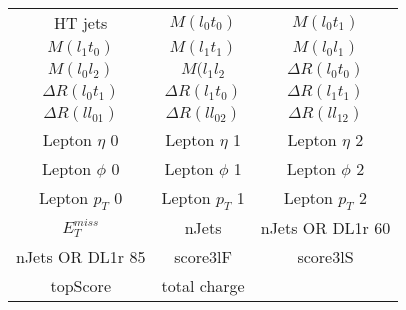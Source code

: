   \begin{center}
  \begin{tabular}{ccc}
    \hline\hline
    HT jets & $M(l_0t_0)$ & $M(l_0t_1)$ \\
    $M(l_1t_0)$ & $M(l_1t_1)$ & $M(l_0l_1)$ \\
    $M(l_0l_2)$ & $M(l_1l_2$ & $\Delta R(l_0t_0)$ \\
    $\Delta R(l_0t_1)$ & $\Delta R(l_1t_0)$ & $\Delta R(l_1t_1)$ \\
    $\Delta R(ll_01)$ & $\Delta R(ll_02)$ & $\Delta R(ll_12)$ \\
    Lepton  $\eta$ 0 & Lepton  $\eta$ 1 & Lepton  $\eta$ 2 \\
    Lepton $\phi$ 0 & Lepton $\phi$ 1 & Lepton $\phi$ 2 \\
    Lepton  $p_T$ 0 & Lepton  $p_T$ 1 & Lepton  $p_T$ 2 \\
    $E_T^{miss}$ & nJets & nJets OR DL1r 60 \\
    nJets OR DL1r 85 & score3lF & score3lS \\
    topScore & total charge \\
    \hline
  \end{tabular}
  \end{center}

